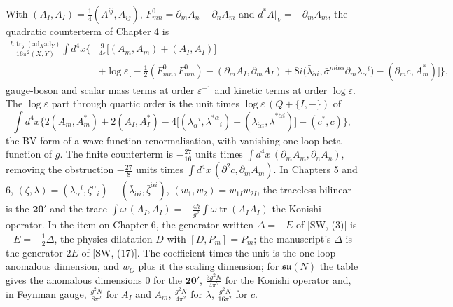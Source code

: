 \begin{remark}
With $(A_I,A_I)=\tfrac14(A^{ij},A_{ij})$, $F^0_{mn}=\partial_mA_n-\partial_nA_m$ and $d^*A|_V=-\partial_mA_m$, the quadratic counterterm of Chapter 4 is
\[
\begin{aligned}
\frac{\hbar\operatorname{tr}_{\mathfrak g}(\mathrm{ad}_X\mathrm{ad}_Y)}{16\pi^2(X,Y)}\int d^4x\Big\{&\frac9{4\varepsilon}\big[(A_m,A_m)+(A_I,A_I)\big]\\
&+\log\varepsilon\Big[-\tfrac12(F^0_{mn},F^0_{mn})-(\partial_mA_I,\partial_mA_I)+8i\big(\bar\lambda_{\dot\alpha i},\bar\sigma^{m\dot\alpha\alpha}\partial_m\lambda_\alpha{}^i\big)-(\partial_mc,A^*_m)\Big]\Big\},
\end{aligned}
\]
gauge-boson and scalar mass terms at order $\varepsilon^{-1}$ and kinetic terms at order $\log\varepsilon$. The $\log\varepsilon$ part through quartic order is the unit times $\log\varepsilon\,(Q+\{I,-\})$ of
\[
\int d^4x\Big\{2(A_m,A^*_m)+2(A_I,A^*_I)-4\big[(\lambda_\alpha{}^i,\lambda^{*\alpha}{}_i)-(\bar\lambda_{\dot\alpha i},\bar\lambda^{*\dot\alpha i})\big]-(c^*,c)\Big\},
\]
the BV form of a wave-function renormalisation, with vanishing one-loop beta function of $g$. The finite counterterm is $-\tfrac{27}{16}$ units times $\int d^4x\,(\partial_mA_m,\partial_nA_n)$, removing the obstruction $-\tfrac{27}{8}$ units times $\int d^4x\,(\partial^2c,\partial_mA_m)$. In Chapters 5 and 6, $(\zeta,\lambda)=(\lambda_\alpha{}^i,\zeta^\alpha{}_i)-(\bar\lambda_{\dot\alpha i},\bar\zeta^{\dot\alpha i})$, $(w_1,w_2)=w_{1I}w_{2I}$, the traceless bilinear is the $\mathbf{20'}$ and the trace $\int\omega\,(A_I,A_I)=-\tfrac{4\hbar}{g^2}\int\omega\operatorname{tr}(A_IA_I)$ the Konishi operator. In the item on Chapter 6, the generator written $\Delta=-E$ of [SW, (3)] is $-E=-\tfrac12\Delta$, the physics dilatation $D$ with $[D,P_m]=P_m$; the manuscript's $\Delta$ is the generator $2E$ of [SW, (17)]. The coefficient times the unit is the one-loop anomalous dimension, and $w_O$ plus it the scaling dimension; for $\mathfrak{su}(N)$ the table gives the anomalous dimensions $0$ for the $\mathbf{20'}$, $\tfrac{3g^2N}{4\pi^2}$ for the Konishi operator and, in Feynman gauge, $\tfrac{g^2N}{8\pi^2}$ for $A_I$ and $A_m$, $\tfrac{g^2N}{4\pi^2}$ for $\lambda$, $\tfrac{g^2N}{16\pi^2}$ for $c$.
\end{remark}
